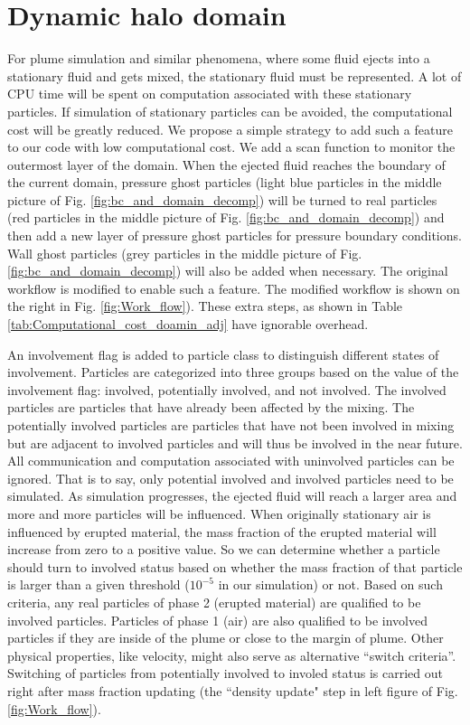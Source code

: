 \section{Dynamic halo domain} 
For plume simulation and similar phenomena, where some fluid ejects into a stationary fluid and gets mixed, the stationary fluid must be represented.
A lot of CPU time will be spent on computation associated with these stationary particles. If simulation of stationary particles can be avoided, the computational cost will be greatly reduced.
We propose a simple strategy to add such a feature to our code with low computational cost. We add a scan function to monitor the outermost layer of the domain. When the ejected fluid reaches the boundary of the current domain, pressure ghost particles (light blue particles in the middle picture of Fig. \ref{fig:bc_and_domain_decomp}) will be turned to real particles (red particles in the middle picture of Fig. \ref{fig:bc_and_domain_decomp}) and then add a new layer of pressure ghost particles for pressure boundary conditions. Wall ghost particles (grey particles in the middle picture of Fig. \ref{fig:bc_and_domain_decomp}) will also be added when necessary. The original workflow is modified to enable such a feature. The modified workflow is shown on the right in Fig. \ref{fig:Work_flow}). These extra steps, as shown in Table \ref{tab:Computational_cost_doamin_adj} have ignorable overhead.

An involvement flag is added to particle class to distinguish different states of involvement. Particles are categorized into three groups based on the value of the involvement flag: involved, potentially involved, and not involved. The involved particles are particles that have already been affected by the mixing. The potentially involved particles are particles that have not been involved in mixing but are adjacent to involved particles and will thus be involved in the near future. 
All communication and computation associated with uninvolved particles can be ignored. That is to say, only potential involved and involved particles need to be simulated.
As simulation progresses, the ejected fluid will reach a larger area and more and more particles will be influenced. When originally stationary air is influenced by erupted material, the mass fraction of the erupted material will increase from zero to a positive value. So we can determine whether a particle should turn to involved status based on whether the mass fraction of that particle is larger than a given threshold ($10^{-5} $ in our simulation) or not. Based on such criteria, any real particles of phase 2 (erupted material) are qualified to be involved particles.  Particles of phase 1 (air) are also qualified to be involved particles if they are inside of the plume or close to the margin of plume. Other physical properties, like velocity, might also serve as alternative ``switch criteria''. Switching of particles from potentially involved to involed status is carried out right after mass fraction updating (the ``density update" step in left figure of Fig. \ref{fig:Work_flow}).

